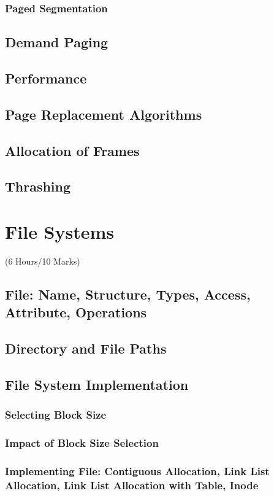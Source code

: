 \documentclass[12pt]{article}
\begin{document}
\subsubsection{Paged Segmentation}
\subsection{Demand Paging}
\subsection{Performance}
\subsection{Page Replacement Algorithms}
\subsection{Allocation of Frames}
\subsection{Thrashing}

\pagebreak
\section{File Systems}
\begin{center}(6 Hours/10 Marks)\end{center}
\subsection{File: Name, Structure, Types, Access, Attribute, Operations}
\subsection{Directory and File Paths}
\subsection{File System Implementation}
\subsubsection{Selecting Block Size}
\subsubsection{Impact of Block Size Selection}
\subsubsection{Implementing File: Contiguous Allocation, Link List Allocation, Link List Allocation with Table, Inode}
\end{document}
